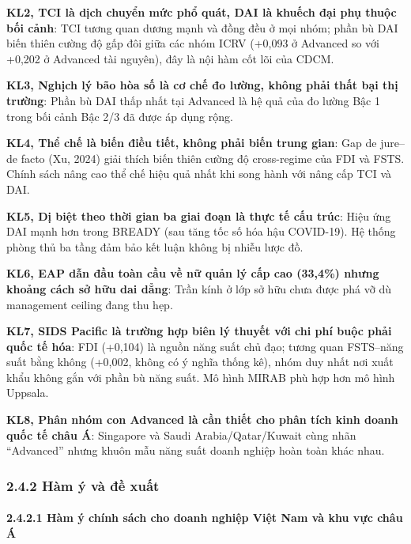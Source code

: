 \documentclass[
  a4paper,
  13pt]{extreport}
\begin{document}
\textbf{KL2, TCI là dịch chuyển mức phổ quát, DAI là khuếch đại phụ
thuộc bối cảnh}: TCI tương quan dương mạnh và đồng đều ở mọi nhóm; phần
bù DAI biến thiên cường độ gấp đôi giữa các nhóm ICRV (+0,093 ở Advanced
so với +0,202 ở Advanced tài nguyên), đây là nội hàm cốt lõi của CDCM.

\textbf{KL3, Nghịch lý bão hòa số là cơ chế đo lường, không phải thất
bại thị trường}: Phần bù DAI thấp nhất tại Advanced là hệ quả của đo
lường Bậc 1 trong bối cảnh Bậc 2/3 đã được áp dụng rộng.

\textbf{KL4, Thể chế là biến điều tiết, không phải biến trung gian}: Gap
de jure--de facto (Xu, 2024) giải thích biến thiên cường độ cross-regime
của FDI và FSTS. Chính sách nâng cao thể chế hiệu quả nhất khi song hành
với nâng cấp TCI và DAI.

\textbf{KL5, Dị biệt theo thời gian ba giai đoạn là thực tế cấu trúc}:
Hiệu ứng DAI mạnh hơn trong BREADY (sau tăng tốc số hóa hậu COVID-19).
Hệ thống phòng thủ ba tầng đảm bảo kết luận không bị nhiễu lược đồ.

\textbf{KL6, EAP dẫn đầu toàn cầu về nữ quản lý cấp cao (33,4\%) nhưng
khoảng cách sở hữu dai dẳng}: Trần kính ở lớp sở hữu chưa được phá vỡ dù
management ceiling đang thu hẹp.

\textbf{KL7, SIDS Pacific là trường hợp biên lý thuyết với chi phí buộc
phải quốc tế hóa}: FDI (+0,104) là nguồn năng suất chủ đạo; tương quan
FSTS--năng suất bằng không (+0,002, không có ý nghĩa thống kê), nhóm duy
nhất nơi xuất khẩu không gắn với phần bù năng suất. Mô hình MIRAB phù
hợp hơn mô hình Uppsala.

\textbf{KL8, Phân nhóm con Advanced là cần thiết cho phân tích kinh
doanh quốc tế châu Á}: Singapore và Saudi Arabia/Qatar/Kuwait cùng nhãn
``Advanced'' nhưng khuôn mẫu năng suất doanh nghiệp hoàn toàn khác nhau.

\hypertarget{huxe0m-uxfd-vuxe0-ux111ux1ec1-xuux1ea5t}{%
\subsubsection{2.4.2 Hàm ý và đề
xuất}\label{huxe0m-uxfd-vuxe0-ux111ux1ec1-xuux1ea5t}}

\hypertarget{huxe0m-uxfd-chuxednh-suxe1ch-cho-doanh-nghiux1ec7p-viux1ec7t-nam-vuxe0-khu-vux1ef1c-chuxe2u-uxe1}{%
\paragraph{2.4.2.1 Hàm ý chính sách cho doanh nghiệp Việt Nam và khu vực
châu
Á}\label{huxe0m-uxfd-chuxednh-suxe1ch-cho-doanh-nghiux1ec7p-viux1ec7t-nam-vuxe0-khu-vux1ef1c-chuxe2u-uxe1}}
\end{document}
